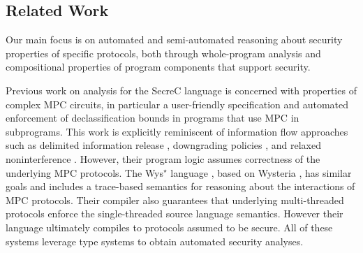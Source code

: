 \compfig

\subsection{Related Work}
\label{section-related-work}

Our main focus is on automated and semi-automated reasoning about
security properties of specific protocols, both through whole-program
analysis and compositional properties of program components that
support security.

Previous work on analysis for the SecreC language
\cite{almeida2018enforcing,10.1145/2637113.2637119} is concerned with
properties of complex MPC circuits, in particular a user-friendly
specification and automated enforcement of declassification bounds in
programs that use MPC in subprograms. This work is explicitly
reminiscent of information flow approaches such as delimited
information release \cite{10.1007/978-3-540-37621-7_9}, downgrading
policies \cite{li2005downgrading}, and relaxed noninterference
\cite{10.1145/1040305.1040319}. However, their program logic assumes
correctness of the underlying MPC protocols.  The Wys$^\star$ language
\cite{wysstar}, based on Wysteria \cite{rastogi2014wysteria}, has
similar goals and includes a trace-based semantics for reasoning about
the interactions of MPC protocols. Their compiler also guarantees that
underlying multi-threaded protocols enforce the single-threaded source
language semantics. However their language ultimately compiles to
protocols assumed to be secure.  All of these systems leverage type
systems to obtain automated security analyses.

